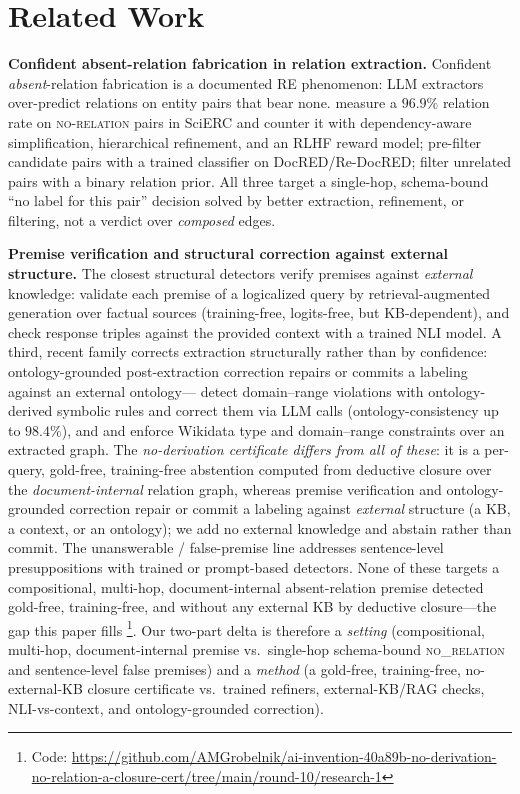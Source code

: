 \documentclass[11pt,letterpaper]{article}
\begin{document}
\section{Related Work}
\label{sec:related}

\textbf{Confident absent-relation fabrication in relation extraction.} Confident \emph{absent}-relation fabrication is a documented RE phenomenon: LLM extractors over-predict relations on entity pairs that bear none. \citet{Yang2025DEPTH} measure a $96.9\%$ relation rate on \textsc{no-relation} pairs in SciERC and counter it with dependency-aware simplification, hierarchical refinement, and an RLHF reward model; \citet{Li2024RelClassifier} pre-filter candidate pairs with a trained classifier on DocRED/Re-DocRED; \citet{Pi2025RelPrior} filter unrelated pairs with a binary relation prior. All three target a single-hop, schema-bound ``no label for this pair'' decision solved by better extraction, refinement, or filtering, not a verdict over \emph{composed} edges.

\textbf{Premise verification and structural correction against external structure.} The closest structural detectors verify premises against \emph{external} knowledge: \citet{Qin2026PremiseVerification} validate each premise of a logicalized query by retrieval-augmented generation over factual sources (training-free, logits-free, but KB-dependent), and \citet{Sansford2024GraphEval} check response triples against the provided context with a trained NLI model. A third, recent family corrects extraction structurally rather than by confidence: ontology-grounded post-extraction correction repairs or commits a labeling against an external ontology---\citet{Loconte2026PostExtractionCorrection} detect domain--range violations with ontology-derived symbolic rules and correct them via LLM calls (ontology-consistency up to $98.4\%$), and \citet{Chepurova2026Wikontic} and \citet{Feng2024OntologyGrounded} enforce Wikidata type and domain--range constraints over an extracted graph. The \emph{no-derivation certificate differs from all of these}: it is a per-query, gold-free, training-free abstention computed from deductive closure over the \emph{document-internal} relation graph, whereas premise verification and ontology-grounded correction repair or commit a labeling against \emph{external} structure (a KB, a context, or an ontology); we add no external knowledge and abstain rather than commit. The unanswerable / false-premise line \citep{Hu2023, Kirichenko2025, Wen2024, Kim2022, Yu2022} addresses sentence-level presuppositions with trained or prompt-based detectors. None of these targets a compositional, multi-hop, document-internal absent-relation premise detected gold-free, training-free, and without any external KB by deductive closure---the gap this paper fills \footnote{Code: \url{https://github.com/AMGrobelnik/ai-invention-40a89b-no-derivation-no-relation-a-closure-cert/tree/main/round-10/research-1}}. Our two-part delta is therefore a \emph{setting} (compositional, multi-hop, document-internal premise vs.\ single-hop schema-bound \textsc{no\_relation} and sentence-level false premises) and a \emph{method} (a gold-free, training-free, no-external-KB closure certificate vs.\ trained refiners, external-KB/RAG checks, NLI-vs-context, and ontology-grounded correction).
\end{document}

